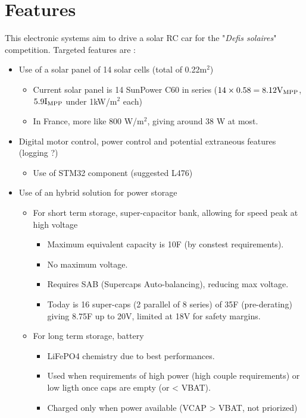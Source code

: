 \chapter{Features}
This electronic systems aim to drive a solar RC car for the "\emph{Defis solaires}" competition.
Targeted features are :
\begin{itemize}
    \item Use of a solar panel of 14 solar cells (total of 0.22m$^2$)
    \begin{itemize}
        \item Current solar panel is 14 SunPower C60 in series ($14 \times 0.58 = 8.12 \mathrm{V_{MPP}}$, $5.9 \mathrm{I_{MPP}}$ under 1kW/m$^2$ each) 
        \item In France, more like 800 W/m$^2$, giving around 38 W at most.  
    \end{itemize}
    \item Digital motor control, power control and potential extraneous features (logging ?)
    \begin{itemize}
        \item Use of STM32 component (suggested L476)
    \end{itemize}
    \item Use of an hybrid solution for power storage
    \begin{itemize}
        \item For short term storage, super-capacitor bank, allowing for speed peak at high voltage
        \begin{itemize}
            \item Maximum equivalent capacity is 10F (by constest requirements).
            \item No maximum voltage.
            \item Requires SAB (Supercaps Auto-balancing), reducing max voltage.
            \item Today is 16 super-caps (2 parallel of 8 series) of 35F (pre-derating) giving 8.75F up to 20V, limited at 18V for safety margins.
        \end{itemize}
        \item For long term storage, battery
        \begin{itemize}
            \item LiFePO4 chemistry due to best performances.
            \item Used when requirements of high power (high couple requirements) or low ligth once caps are empty (or < VBAT).
            \item Charged only when power available (VCAP > VBAT, not priorized)

\end{itemize}
\end{itemize}
\end{itemize}
